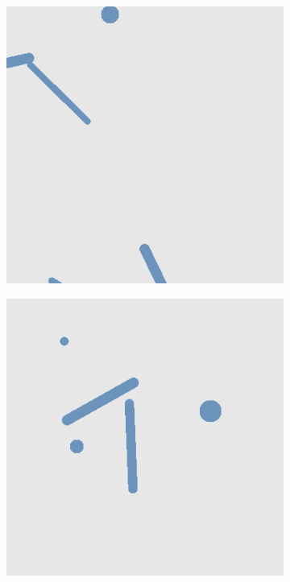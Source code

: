 \begin{figure}[H]
    \begin{subfigure}{\w}
        \includegraphics[width=\linewidth]{figures/generated-worlds/world_3.png}
    \end{subfigure}
    \hspace*{\fill}
    \begin{subfigure}{\w}
        \includegraphics[width=\linewidth]{figures/generated-worlds/world_4.png}

\end{subfigure}
\end{figure}
